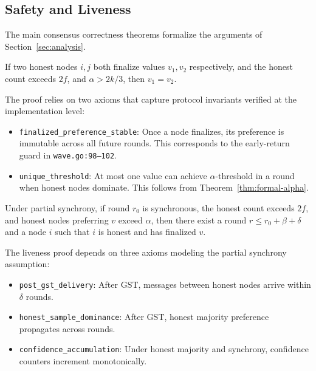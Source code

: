 \subsection{Safety and Liveness}

The main consensus correctness theorems formalize the arguments of Section~\ref{sec:analysis}.

\begin{theorem}
\label{thm:formal-safety}
If two honest nodes $i, j$ both finalize values $v_1, v_2$ respectively, and the honest
count exceeds $2f$, and $\alpha > 2k/3$, then $v_1 = v_2$.
\end{theorem}

The proof relies on two axioms that capture protocol invariants verified at the
implementation level:
\begin{itemize}[nosep]
\item \texttt{finalized\_preference\_stable}: Once a node finalizes, its preference is
immutable across all future rounds. This corresponds to the early-return guard in
\texttt{wave.go:98--102}.
\item \texttt{unique\_threshold}: At most one value can achieve $\alpha$-threshold in a
round when honest nodes dominate. This follows from Theorem~\ref{thm:formal-alpha}.
\end{itemize}

\begin{theorem}
\label{thm:formal-liveness}
Under partial synchrony, if round $r_0$ is synchronous, the honest count exceeds $2f$,
and honest nodes preferring $v$ exceed $\alpha$, then there exist a round
$r \leq r_0 + \beta + \delta$ and a node $i$ such that $i$ is honest and has finalized $v$.
\end{theorem}

The liveness proof depends on three axioms modeling the partial synchrony assumption:
\begin{itemize}[nosep]
\item \texttt{post\_gst\_delivery}: After GST, messages between honest nodes arrive within
$\delta$ rounds.
\item \texttt{honest\_sample\_dominance}: After GST, honest majority preference propagates
across rounds.
\item \texttt{confidence\_accumulation}: Under honest majority and synchrony, confidence
counters increment monotonically.
\end{itemize}

